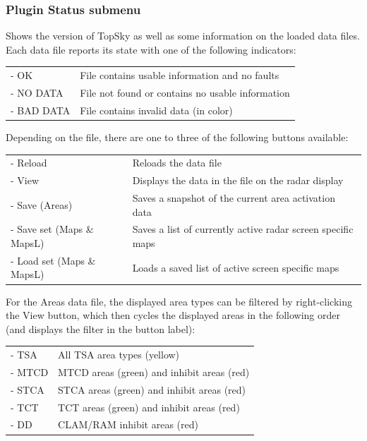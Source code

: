 \documentclass[a4paper,oneside,11pt]{memoir}
\begin{document}
\subsubsection{Plugin Status submenu}
\label{menu:status}
Shows the version of TopSky as well as some information on the loaded data files. Each data file reports its state with one of the following indicators:

\bigskip

\begin{tabular}{l l}
- OK        & File contains usable information and no faults\\
- NO DATA   & File not found or contains no usable information\\
- BAD DATA  & File contains invalid data (in {Warning} color)\\
\end{tabular}

\bigskip

Depending on the file, there are one to three of the following buttons available:

\bigskip

\begin{tabular}{l l}
- Reload                    & Reloads the data file\\
- View                    & Displays the data in the file on the radar display\\
- Save (Areas)            & Saves a snapshot of the current area activation data\\
- Save set (Maps \& MapsL) & Saves a list of currently active radar screen specific maps\\
- Load set (Maps \& MapsL) & Loads a saved list of active screen specific maps\\
\end{tabular}

\bigskip

For the Areas data file, the displayed area types can be filtered by right-clicking the View button, which then cycles the displayed areas in the following order (and displays the filter in the button label):

\begin{tabular}{l l}
- TSA   & All TSA area types (yellow)                 \\
- MTCD  & MTCD areas (green) and inhibit areas (red)  \\
- STCA  & STCA areas (green) and inhibit areas (red)  \\
- TCT   & TCT areas (green) and inhibit areas (red)   \\
- DD    & CLAM/RAM inhibit areas (red)                \\
\end{tabular}
\end{document}
